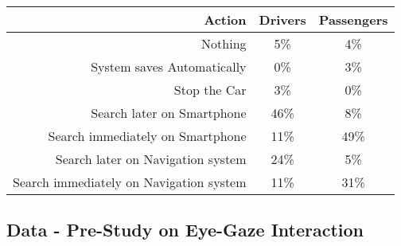 \begin{center}
\begin{minipage}{\textwidth}
        \vspace{\baselineskip}

        \begin{tabular}{r|c|c}
            \toprule
            \textbf{Action}             & \textbf{Drivers}   & \textbf{Passengers} \\
            \midrule
            Nothing                     & 5\%                 & 4\% \\
            System saves Automatically  & 0\%                 & 3\% \\
            Stop the Car                & 3\%                 & 0\% \\
            Search later on Smartphone  & 46\%                & 8\% \\
            Search immediately on Smartphone & 11\%           & 49\% \\
            Search later on Navigation system & 24\%          & 5\% \\
            Search immediately on Navigation system & 11\%    & 31\% \\
            \bottomrule
        \end{tabular}

    \end{minipage}
\end{center}



\clearpage
\subsection{Data - Pre-Study on Eye-Gaze Interaction}

